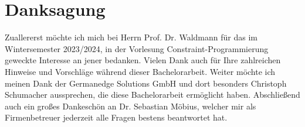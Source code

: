 \chapter*{Danksagung}
\label{chapter:Danksagung}

Zuallererst möchte ich mich bei Herrn Prof. Dr. Waldmann für das im Wintersemester 2023/2024,
in der Vorlesung Constraint-Programmierung geweckte Interesse an jener bedanken.
Vielen Dank auch für Ihre zahlreichen Hinweise und Vorschläge während dieser Bachelorarbeit.
Weiter möchte ich meinen Dank der Germanedge Solutions GmbH und dort besonders Christoph Schumacher aussprechen,
die diese Bachelorarbeit ermöglicht haben.
Abschließend auch ein großes Dankeschön an Dr. Sebastian Möbius, welcher mir als Firmenbetreuer jederzeit alle
Fragen bestens beantwortet hat.